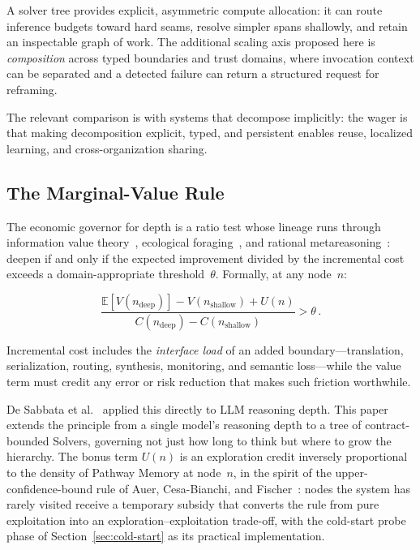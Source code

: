\documentclass[11pt]{article}
\begin{document}
A solver tree provides explicit, asymmetric compute allocation: it can route inference budgets toward hard seams, resolve simpler spans shallowly, and retain an inspectable graph of work. The additional scaling axis proposed here is \emph{composition} across typed boundaries and trust domains, where invocation context can be separated and a detected failure can return a structured request for reframing.

The relevant comparison is with systems that decompose implicitly: the wager is that making decomposition explicit, typed, and persistent enables reuse, localized learning, and cross-organization sharing.

\subsection{The Marginal-Value Rule}
\label{sec:mvr}

The economic governor for depth is a ratio test whose lineage runs through information value theory~\cite{howard1966}, ecological foraging~\cite{charnov1976}, and rational metareasoning~\cite{Russell1991, Gershman2015}: deepen if and only if the expected improvement divided by the incremental cost exceeds a domain-appropriate threshold~$\theta$. Formally, at any node~$n$:

\begin{equation}
\frac{\mathbb{E}[V(n_{\text{deep}})] - V(n_{\text{shallow}}) + U(n)}{C(n_{\text{deep}}) - C(n_{\text{shallow}})} > \theta \,.
\end{equation}

Incremental cost includes the \emph{interface load} of an added boundary---translation, serialization, routing, synthesis, monitoring, and semantic loss---while the value term must credit any error or risk reduction that makes such friction worthwhile.

\noindent De Sabbata et al.~\cite{DeSabbata2024} applied this directly to LLM reasoning depth. This paper extends the principle from a single model's reasoning depth to a tree of contract-bounded Solvers, governing not just how long to think but where to grow the hierarchy. The bonus term $U(n)$ is an exploration credit inversely proportional to the density of Pathway Memory at node~$n$, in the spirit of the upper-confidence-bound rule of Auer, Cesa-Bianchi, and Fischer~\cite{auer2002ucb}: nodes the system has rarely visited receive a temporary subsidy that converts the rule from pure exploitation into an exploration--exploitation trade-off, with the cold-start probe phase of Section~\ref{sec:cold-start} as its practical implementation.
\end{document}
